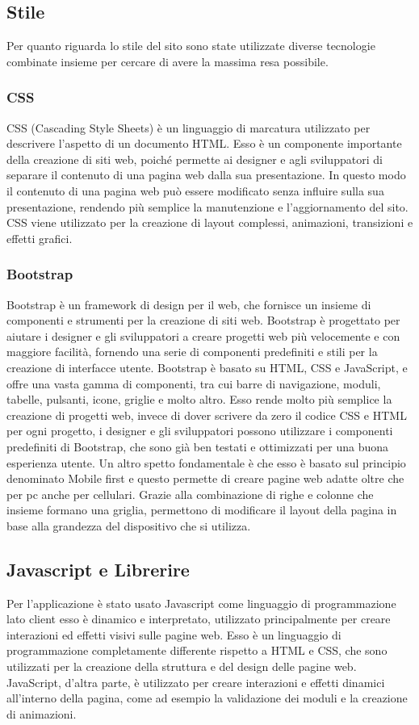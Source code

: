 \documentclass[a4paper,final,12pt]{report}
\begin{document}
\subsection{Stile}
Per quanto riguarda lo stile del sito sono state utilizzate diverse tecnologie combinate insieme per cercare di avere la massima resa possibile.

\subsubsection{CSS}
CSS (Cascading Style Sheets) è un linguaggio di marcatura utilizzato per descrivere l'aspetto di un documento HTML. Esso è un componente importante della creazione di siti web, poiché permette ai designer e agli sviluppatori di separare il contenuto di una pagina web dalla sua presentazione. In questo modo il contenuto di una pagina web può essere modificato senza influire sulla sua presentazione, rendendo più semplice la manutenzione e l'aggiornamento del sito. CSS viene utilizzato per la creazione di layout complessi, animazioni, transizioni e effetti grafici. 

\subsubsection{Bootstrap}
Bootstrap è un framework di design per il web, che fornisce un insieme di componenti e strumenti per la creazione di siti web. Bootstrap è progettato per aiutare i designer e gli sviluppatori a creare progetti web più velocemente e con maggiore facilità, fornendo una serie di componenti predefiniti e stili per la creazione di interfacce utente. Bootstrap è basato su HTML, CSS e JavaScript, e offre una vasta gamma di componenti, tra cui barre di navigazione, moduli, tabelle, pulsanti, icone, griglie e molto altro.
Esso rende molto più semplice la creazione di progetti web, invece di dover scrivere da zero il codice CSS e HTML per ogni progetto, i designer e gli sviluppatori possono utilizzare i componenti predefiniti di Bootstrap, che sono già ben testati e ottimizzati per una buona esperienza utente.
Un altro spetto fondamentale è che esso è basato sul principio denominato Mobile first e questo permette di creare pagine web adatte oltre che per pc anche per cellulari. Grazie alla combinazione di righe e colonne che insieme formano una griglia, permettono di modificare il layout della pagina in base alla grandezza del dispositivo che si utilizza.

\subsection{Javascript e Librerire}
Per l'applicazione è stato usato Javascript come linguaggio di programmazione lato client esso è dinamico e interpretato, utilizzato principalmente per creare interazioni ed effetti visivi sulle pagine web. Esso è un linguaggio di programmazione completamente differente rispetto a HTML e CSS, che sono utilizzati per la creazione della struttura e del design delle pagine web. JavaScript, d'altra parte, è utilizzato per creare interazioni e effetti dinamici all'interno della pagina, come ad esempio la validazione dei moduli e la creazione di animazioni.
\end{document}
